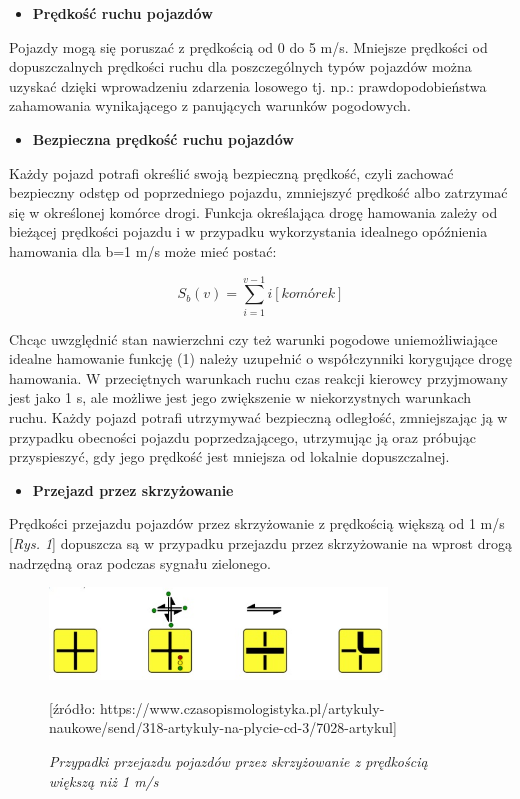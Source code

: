 \documentclass{sprawozdanie-agh}
\begin{document}
	\begin{itemize}
		\item{\textbf{Prędkość ruchu pojazdów}}
	\end{itemize}

	Pojazdy mogą się poruszać z prędkością od 0 do 5 m/s. Mniejsze prędkości od dopuszczalnych prędkości ruchu dla poszczególnych typów pojazdów można uzyskać dzięki wprowadzeniu zdarzenia losowego tj. np.: prawdopodobieństwa zahamowania wynikającego z panujących warunków pogodowych.

	\begin{itemize}
		\item{\textbf{Bezpieczna prędkość ruchu pojazdów}}
	\end{itemize}

	Każdy pojazd potrafi określić swoją bezpieczną prędkość, czyli zachować bezpieczny odstęp od poprzedniego pojazdu, zmniejszyć prędkość albo zatrzymać się w określonej komórce drogi. Funkcja określająca drogę hamowania zależy od bieżącej prędkości pojazdu i w przypadku wykorzystania idealnego opóźnienia hamowania dla b=1 m/s może mieć postać:

	\begin{equation}
		S_{b}(v)=\sum_{i=1}^{v-1} i[komórek]
	\end{equation}

	Chcąc uwzględnić stan nawierzchni czy też warunki pogodowe uniemożliwiające idealne hamowanie funkcję (1) należy uzupełnić o współczynniki korygujące drogę hamowania.
	W przeciętnych warunkach ruchu czas reakcji kierowcy przyjmowany jest jako 1 s, ale możliwe jest jego zwiększenie w niekorzystnych warunkach ruchu.
	Każdy pojazd potrafi utrzymywać bezpieczną odległość, zmniejszając ją w przypadku obecności pojazdu poprzedzającego, utrzymując ją oraz próbując przyspieszyć, gdy jego prędkość jest mniejsza od lokalnie dopuszczalnej.

	\begin{itemize}
		\item{\textbf{Przejazd przez skrzyżowanie}}
	\end{itemize}

	Prędkości przejazdu pojazdów przez skrzyżowanie z prędkością większą od 1 m/s [\textit{Rys. 1}] dopuszcza są w przypadku przejazdu przez skrzyżowanie na wprost drogą nadrzędną oraz podczas sygnału zielonego.

	\begin{figure}[H]
		\centering
		\includegraphics[width=0.8\textwidth]{S1.jpg}
		\caption{\textit{Przypadki przejazdu pojazdów przez skrzyżowanie z prędkością większą niż 1 m/s}}
		[\small{źródło: https://www.czasopismologistyka.pl/artykuly-naukowe/send/318-artykuly-na-plycie-cd-3/7028-artykul}]
		\label{fig:S1}
	\end{figure}
\end{document}
